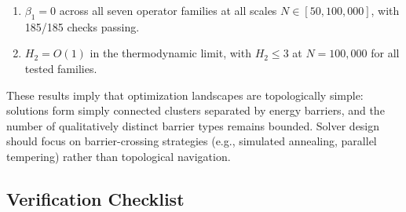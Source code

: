 \documentclass[12pt,a4paper]{article}
\theoremstyle{definition}\newtheorem{definition}[theorem]{Definition}
\theoremstyle{remark}\newtheorem{remark}[theorem]{Remark}
\newcommand{\Htwo}{H_2}
\newcommand{\betaone}{\beta_1}
\begin{document}
\begin{enumerate}
  \item $\betaone = 0$ across all seven operator families at all scales
    $N \in [50, 100{,}000]$, with 185/185 checks passing.
  \item $\Htwo = O(1)$ in the thermodynamic limit, with $\Htwo \leq 3$ at
    $N = 100{,}000$ for all tested families.
\end{enumerate}

These results imply that optimization landscapes are topologically simple:
solutions form simply connected clusters separated by energy barriers, and
the number of qualitatively distinct barrier types remains bounded. Solver
design should focus on barrier-crossing strategies (e.g., simulated
annealing, parallel tempering) rather than topological navigation.

\subsection{Verification Checklist}
\end{document}
